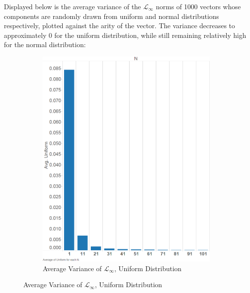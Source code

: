 \documentclass{article}
\begin{document}
Displayed below is the average variance of the $\mathcal{L}_{\infty}$ norms of 1000 vectors whose components are randomly drawn from uniform and normal distributions respectively, plotted against the arity of the vector.  The variance decreases to approximately 0 for the uniform distribution, while still remaining relatively high for the normal distribution:
\begin{figure}[H]
\centering
\begin{subfigure}[h]{0.7\textwidth}
        \includegraphics[width=.75\textwidth]{exp2-var-uniform.png}
        \caption{Average Variance of $\mathcal{L}_{\infty}$, Uniform Distribution}
        \label{fig:exp2varuniform}
\end{subfigure}
\end{figure}
\end{document}
